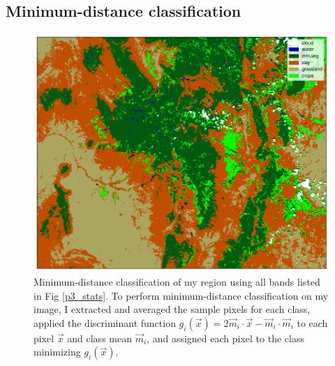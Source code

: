 \documentclass[12pt]{article}
\begin{document}
\clearpage

\subsection{Minimum-distance classification}

\begin{figure}[h!]
    \centering
    \includegraphics[width=.7\linewidth]{figures/p4/mdc_4+5.png}
    \caption{Minimum-distance classification of my region using all bands listed in Fig \ref{p3_stats}. To perform minimum-distance classification on my image, I extracted and averaged the sample pixels for each class, applied the discriminant function $g_i(\vec{x})=2\vec{m}_i\cdot\vec{x}-\vec{m}_i\cdot\vec{m}_i$ to each pixel $\vec{x}$ and class mean $\vec{m}_i$, and assigned each pixel to the class minimizing $g_i({\vec{x}})$.}
    \label{p4_mdc}
\end{figure}
\end{document}
